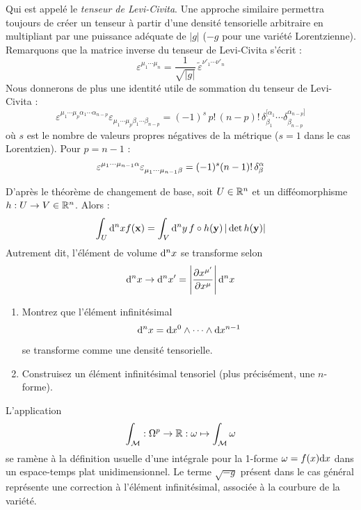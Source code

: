 Qui est appelé le \emph{tenseur de Levi-Civita}. Une approche similaire permettra toujours de créer un tenseur à partir d'une densité tensorielle arbitraire en multipliant par une puissance adéquate de $\lvert g \rvert$ ($-g$ pour une variété Lorentzienne). Remarquons que la matrice inverse du tenseur de Levi-Civita s'écrit :
\begin{equation}
    \varepsilon^{{\mu_1} \cdots {\mu_n}} = \frac{1}{\sqrt{\lvert g\rvert}} \, \tilde{\varepsilon}^{{\nu'_1}  \cdots {\nu'_n}}
\end{equation}
Nous donnerons de plus une identité utile de sommation du tenseur de Levi-Civita :
\begin{equation}
    \varepsilon^{{\mu_1} \cdots {\mu_p} {\alpha_1} \cdots {\alpha_{n-p}}} \varepsilon_{{\mu_1} \cdots {\mu_p} {\beta_1} \cdots {\beta_{n-p}}} = (-1)^s \, p! \, (n-p)! \,\delta^{[\alpha_1}_{\beta_1} \cdots \delta^{\alpha_{n-p}]}_{\beta_{n-p}}
\end{equation}
où $s$ est le nombre de valeurs propres négatives de la métrique ($s=1$ dans le cas Lorentzien). Pour $p = n - 1$ :
\begin{equation}
    \varepsilon\indices{^{\mu_1} ^\cdots ^{\mu_{n-1}} ^{\alpha}} \varepsilon\indices{_{\mu_1} _\cdots _{\mu_{n-1}} _{\beta}}= (-1)^s (n-1) ! \, \delta^\alpha_\beta
\end{equation}
\begin{exerc}
    \label{ex:densités}
    D'après le théorème de changement de base, soit $U \in\mathbb{R}^n$ et un difféomorphisme $h:U \to V \in \mathbb{R}^n$. Alors :
    \begin{equation*}
        \int_U \mathrm{d}^n x f(\bm{\mathrm{x}}) = \int_V \mathrm{d}^n y \, f \circ h (\bm{\mathrm{y}}) \, \vert \det h(\bm{\mathrm{y}})\vert
    \end{equation*}
    Autrement dit, l'élément de volume $\mathrm{d}^n x$ se transforme selon
    \begin{equation*}
        \mathrm{d}^n x \to \mathrm{d}^n x' = \left| \frac{\partial x^{\mu'}}{\partial x^\mu}\right| \mathrm{d}^n x
    \end{equation*}
    \begin{enumerate}
        \item Montrez que l'élément infinitésimal
        \begin{equation*}
            \mathrm{d}^n x = \mathrm{d} x^0 \wedge \cdots \wedge \mathrm{d} x^{n-1}
        \end{equation*}
        se transforme comme une densité tensorielle.
        \item Construisez un élément infinitésimal tensoriel (plus précisément, une $n$-forme).
    \end{enumerate}
    L'application
    \begin{equation}
        \int_\mathcal{M} : \Omega^p \to \mathbb{R} : \omega \mapsto \int_\mathcal{M} \omega
    \end{equation}
    se ramène à la définition usuelle d'une intégrale pour la 1-forme $\omega = f(x) \mathrm{d} x$ dans un espace-temps plat unidimensionnel. Le terme $\sqrt{-g}$ présent dans le cas général représente une correction à l'élément infinitésimal, associée à la courbure de la variété.
\end{exerc}
